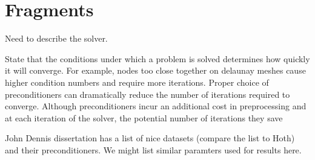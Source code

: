 \section{Fragments}
Need to describe the solver. 

State that the conditions under which a problem is solved determines how quickly it will converge. For example, nodes too close together on delaunay meshes cause higher condition numbers and require more iterations. Proper choice of preconditioners can dramatically reduce the number of iterations required to converge. Although preconditioners incur an additional cost in preprocessing and at each iteration of the solver, the potential number of iterations they save 


John Dennis dissertation has a list of nice datasets (compare the list to Hoth) and their preconditioners. We might list similar paramters used for results here. 
